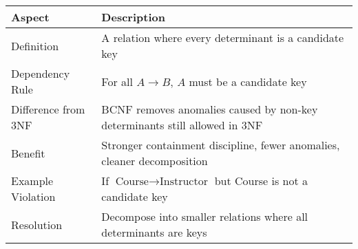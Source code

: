 \begin{NxLightBox}[title={Boyce-Codd Normal Form Summary}]
    \begin{tabularx}{\linewidth}{|l|X|}
        \hline
        \textbf{Aspect} & \textbf{Description} \\
        \hline
        Definition & A relation where every determinant is a candidate key \\
        \hline
        Dependency Rule & For all \( A \rightarrow B \), \( A \) must be a candidate key \\
        \hline
        Difference from 3NF & BCNF removes anomalies caused by non-key determinants still allowed in 3NF \\
        \hline
        Benefit & Stronger containment discipline, fewer anomalies, cleaner decomposition \\
        \hline
        Example Violation & If \( \text{Course} \rightarrow \text{Instructor} \) but Course is not a candidate key \\
        \hline
        Resolution & Decompose into smaller relations where all determinants are keys \\
        \hline
    \end{tabularx}
\end{NxLightBox}


